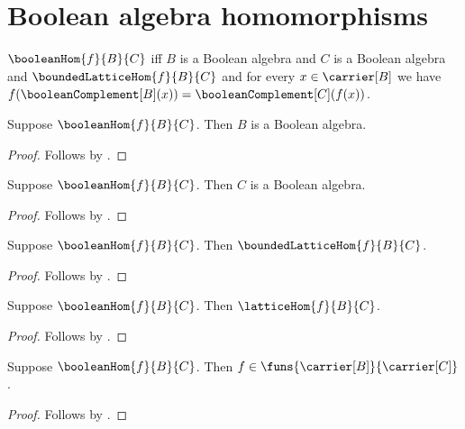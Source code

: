 \section{Boolean algebra homomorphisms}




\begin{definition}\label{boolean_hom}
    $\booleanHom{f}{B}{C}$ iff
        $B$ is a Boolean algebra and $C$ is a Boolean algebra and
        $\boundedLatticeHom{f}{B}{C}$ and
        for every $x\in\carrier[B]$ we have
            $f(\booleanComplement[B](x))
                =\booleanComplement[C](f(x))$.
\end{definition}

\begin{proposition}\label{boolean_hom_source_boolean_algebra}
    Suppose $\booleanHom{f}{B}{C}$.
    Then $B$ is a Boolean algebra.
\end{proposition}
\begin{proof}
    Follows by .
\end{proof}

\begin{proposition}\label{boolean_hom_target_boolean_algebra}
    Suppose $\booleanHom{f}{B}{C}$.
    Then $C$ is a Boolean algebra.
\end{proposition}
\begin{proof}
    Follows by .
\end{proof}

\begin{proposition}\label{boolean_hom_is_bounded_lattice_hom}
    Suppose $\booleanHom{f}{B}{C}$.
    Then $\boundedLatticeHom{f}{B}{C}$.
\end{proposition}
\begin{proof}
    Follows by .
\end{proof}

\begin{proposition}\label{boolean_hom_is_lattice_hom}
    Suppose $\booleanHom{f}{B}{C}$.
    Then $\latticeHom{f}{B}{C}$.
\end{proposition}
\begin{proof}
    Follows by
        .
\end{proof}

\begin{proposition}\label{boolean_hom_type}
    Suppose $\booleanHom{f}{B}{C}$.
    Then $f\in\funs{\carrier[B]}{\carrier[C]}$.
\end{proposition}
\begin{proof}
    Follows by
        .
\end{proof}

